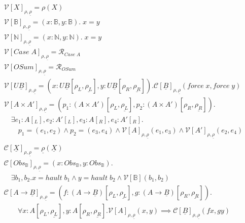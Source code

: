 \documentclass[acmsmall]{acmart}
\newcommand{\eric}[1]{\textcolor{red}{ <eric-#1> }}
\begin{document}
\begin{comment}
To understand the utility of this principle, we can observe what it says for the universal type. For any $M,N : \forall X.\underline{B}$:
\[
  \forall Y,Z,R:Rel_v[Y,Z].\mathcal{C}[\underline{B}]_R(M[Y],N[Z]) \iff M =_{\forall X. \underline{B}} N
\]
\end{comment}
\begin{figure}[!htbp]
  \centering
  \scriptsize
  \begin{align*}
    &\mathcal{V}[X]_{\rho,\underline{\rho}} = \rho(X)\\
    &\mathcal{V}[\mathbb{B}]_{\rho,\underline{\rho}} = (x:\mathbb{B}, y: \mathbb{B}). \; x = y\\
    &\mathcal{V}[\mathbb{N}]_{\rho,\underline{\rho}} =(x:\mathbb{N}, y: \mathbb{N}). \; x = y\\
    &\mathcal{V}[Case\;A]_{\rho,\underline{\rho}} = \mathcal{R}_{Case\;A}\\
    &\mathcal{V}[OSum]_{\rho,\underline{\rho}} = \mathcal{R}_{OSum}\\
    &\mathcal{V}[U\underline{B}]_{\rho,\underline{\rho}} = (x : U\underline{B}[\rho_L,\underline{\rho_L}], y :U\underline{B}[\rho_R,\underline{\rho_R}] ). \mathcal{C}[\underline{B}]_{\rho,\underline{\rho}}(force\;x, force\; y)
    \\
    &\mathcal{V}[A\times A']_{\rho,\underline{\rho}} = (p_1 : (A\times A')[\rho_L,\underline{\rho_L}],p_2 : (A\times A')[\rho_R,\underline{\rho_R}]).\\
    &\quad  
    \exists e_1:A[_L],e_2:A'[_L],e_3:A[_R],e_4: A'[_R].\\
    &\quad \quad p_1 = (e_1,e_2) \land p_2 = (e_3,e_4) \land \mathcal{V}[A]_{\rho,\underline{\rho}}(e_1,e_3) \land \mathcal{V}[A']_{\rho,\underline{\rho}}(e_2,e_4)
    \\
    \\
    &\mathcal{C}[\underline{X}]_{\rho,\underline{\rho}} = \underline{\rho}(\underline{X})\\
    &\mathcal{C}[Obs_{\mathbb{B}}]_{\rho,\underline{\rho}} = (x: Obs_{\mathbb{B}},y: Obs_{\mathbb{B}}).\\
    &\quad \exists b_1,b_2 . x = hault \; b_1 \land y = hault \;b_2 \land  \mathcal{V}[\mathbb{B}](b_1,b_2)\\
    &\mathcal{C}[A\rightarrow \underline{B}]_{\rho,\underline{\rho}} = (f : (A \rightarrow \underline{B})[\rho_L,\underline{\rho_L}],g : (A \rightarrow \underline{B})[\rho_R,\underline{\rho_R}]).\\&\;\;\;\;\;\;\;\forall x : A[\rho_L,\underline{\rho_L}], y: A[\rho_R,\underline{\rho_R}].\mathcal{V}[A]_{\rho,\underline{\rho}}(x,y) \implies \mathcal{C}[\underline{B}]_{\rho,\underline{\rho}}(fx,gy)\\

\end{align*}
\end{figure}
\end{document}
